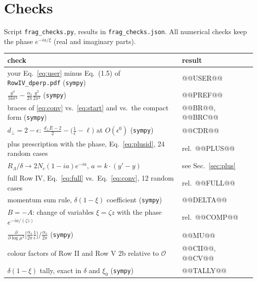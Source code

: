 \documentclass[10pt]{article}
\numberwithin{equation}{section}
\newcommand{\OO}{\mathcal O}
\begin{document}
\section{Checks}
Script \texttt{frag\_checks.py}, results in \texttt{frag\_checks.json}. All numerical checks keep the phase $e^{-ia/\xi}$ (real and imaginary parts).
\begin{center}\small
\begin{tabular}{@{}p{}p{}@{}}\toprule
check & result\\\midrule
your Eq.~\eqref{eq:user} minus Eq.~(1.5) of \texttt{RowIV\_dperp.pdf} (\texttt{sympy}) & @@USER@@\\
$\frac{g^4}{16\pi^4}-\frac{\alpha_s}{2\pi}\frac{g^2}{2\pi^2}$ (\texttt{sympy}) & @@PREF@@\\
braces of \eqref{eq:conv} vs.\ \eqref{eq:start} and vs.\ the compact form (\texttt{sympy}) & @@BR@@, @@BRC@@\\
$d_\perp=2-\epsilon$: $\frac{d_\perp\bar E-2}{2}-\big(\frac1{\bar\epsilon}-\ell\big)$ at $O(\epsilon^0)$ (\texttt{sympy}) & @@CDR@@\\
plus prescription with the phase, Eq.~\eqref{eq:plusid}, 24 random cases & rel.\ @@PLUS@@\\
$R_\Lambda/\delta\to2N_c(1-ia)e^{-ia}$, $a=k\cdot(y'-y)$ & see Sec.~\ref{sec:plus}\\
full Row IV, Eq.~\eqref{eq:full} vs.\ Eq.~\eqref{eq:conv}, 12 random cases & rel.\ @@FULL@@\\
momentum sum rule, $\delta(1-\xi)$ coefficient (\texttt{sympy}) & @@DELTA@@\\
$B=-A$: change of variables $\xi=\zeta z$ with the phase $e^{-ia/(\zeta z)}$ & rel.\ @@COMP@@\\
$\frac{\partial}{\partial\log\mu^2}\big[\frac{\alpha_s}{2\pi}\frac{1}{\bar\epsilon}\big]\big/\frac{\alpha_s}{2\pi}$ (\texttt{sympy}) & @@MU@@\\
colour factors of Row II and Row V 2b relative to $\OO$ & @@CII@@, @@CV@@\\
$\delta(1-\xi)$ tally, exact in $\delta$ and $\xi_0$ (\texttt{sympy}) & @@TALLY@@\\\bottomrule
\end{tabular}
\end{center}
\end{document}
